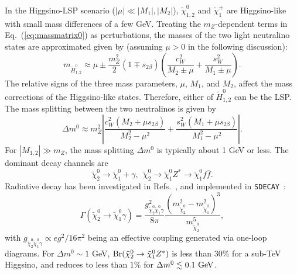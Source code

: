 \documentclass[
    twocolumn,
    superscriptaddress,
    amsmath, 
    amssymb,
    aps,
    reprint,
    floatfix
]{revtex4-2}
\newcommand{\Shufang}[1]{\textcolor{red} {SS: #1}}
\newcommand{\px}[1]{\textcolor{blue} {PX: {\bf Comment:} {\it #1}}}
\begin{document}
In the Higgsino-LSP scenario ($|\mu| \ll |M_1|, |M_2|$), $\tilde{\chi}_{1,2}^0$ and $\tilde{\chi}_1^\pm$ are Higgsino-like with small mass differences of a few GeV. Treating the $m_Z$-dependent terms in Eq.~(\ref{eq:massmatrix0}) as perturbations, the masses of the two light neutralino states are approximated given by (assuming \(\mu > 0\) in the following discussion):
\begin{equation}
\label{eq:mnue}
m_{\tilde{H}_{1,2}^0} \approx \mu \pm \frac{m_Z^2}{2}\left(1 \mp s_{2\beta} \right) \left(
\frac{c^2_W} { M_2 \pm \mu } + \frac{ s^2_W}{ M_1 \pm \mu } \right). 
\end{equation}
The relative signs of the three mass parameters, $\mu$, $M_1$, and $M_2$,  affect the mass corrections of the Higgsino-like states. Therefore, either of $\tilde{H}_{1,2}^0$ can be the LSP. The mass splitting between the two neutralinos is given by  
% 
\begin{equation}
\label{eq:msplitn2n1}
\Delta m^0 \approx
m_Z^2 \left| \frac{c_W^2(M_2 + \mu s_{2\beta})}{M_2^2 - \mu^2} + \frac{s_W^2( M_1 + \mu s_{2\beta})}{M_1^2 - \mu^2 } \right|.
\end{equation}
For $|M_{1,2}|\gg m_Z$,  the mass splitting $\Delta m^0 $ is typically about 1 GeV or less. The dominant decay channels are 
\begin{equation}
\tilde{\chi}_2^0 \to \tilde{\chi}_1^0 + \gamma,\ \ \tilde{\chi}_2^0 \to \tilde{\chi}_1^0 Z^* \to \tilde{\chi}_1^0 f\bar{f}.
\end{equation}
% 
Radiative decay has been investigated in Refs.~\cite{Haber:1988px, Gunion:1987yh, Ambrosanio:1995az, Ambrosanio:1996gz, Baer:2002kv}, and implemented in \texttt{SDECAY}~\cite{Djouadi:2006bz}:
\begin{equation}
\label{eq:Gchi20}
	\Gamma(\tilde{\chi}_2^0 \to \tilde{\chi}_1^0 \gamma) = \frac{g_{\tilde{\chi}_2^0 \tilde{\chi}_1^0 \gamma}^2 }{8 \pi } \frac{\left( m_{\tilde{\chi}_2^0}^2 - m_{\tilde{\chi}_1^0}^2 \right)^3}{m_{\tilde{\chi}_2^0}^5},
\end{equation}
with $g_{\tilde{\chi}_2^0 \tilde{\chi}_1^0 \gamma} \propto e g^2 /16\pi^2 $  being an effective coupling generated via one-loop diagrams. 
For $\Delta m^0\sim 1$ GeV, ${\rm Br}(\tilde{\chi}_2^0 \rightarrow \tilde{\chi}_1^0 Z^*)$ is less than  30\% for a sub-TeV Higgsino, and reduces to less than $1\%$ for $\Delta m^0 \lesssim  0.1~{\rm GeV}$.
\end{document}
